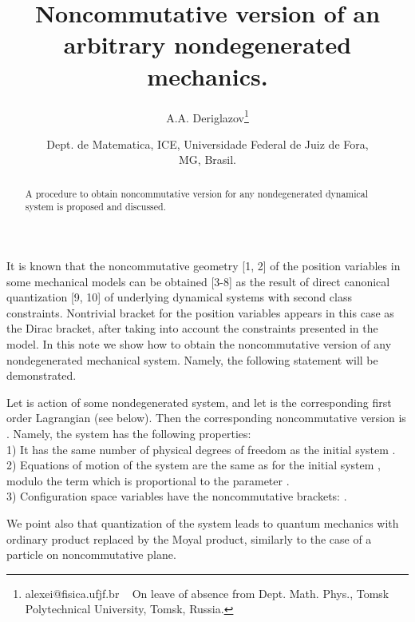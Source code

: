 \documentclass[paper a4]{article}
\title{Noncommutative version of an arbitrary nondegenerated mechanics.}
\author{A.A. Deriglazov\footnote{alexei@fisica.ufjf.br ~ On leave of
absence from Dept. Math. Phys., Tomsk Polytechnical University,
Tomsk, Russia.}}
\date{Dept. de Matematica, ICE, Universidade Federal de Juiz de Fora,\\
MG, Brasil.}
\begin{document}
\maketitle
\large
\begin{abstract}
A procedure to obtain noncommutative version for any nondegenerated
dynamical system is proposed and discussed.
\end{abstract}


\noindent
It is known that the
noncommutative geometry [1, 2] of the position variables in some mechanical
models can be obtained [3-8] as the result of direct canonical quantization
[9, 10] of underlying dynamical
systems with second class constraints. Nontrivial bracket for
the position variables appears in this case as the Dirac bracket,
after taking into account the constraints presented in the model.
In this note we show how to
obtain the noncommutative version of any nondegenerated mechanical system.
Namely, the following statement will be demonstrated.

Let \coordHE{} is action of some nondegenerated system,
and let \coordHE{} is
the corresponding first order Lagrangian (see below). Then the corresponding
noncommutative version is
\coordHE{}.
Namely, the system \coordHE{} has the following properties: \\
1) It has the same number of physical degrees of freedom as the initial
system \coordHE{}. \\
2) Equations of motion of the system are the same as for the initial
system \coordHE{}, modulo the term which is proportional to the parameter
\coordHE{}. \\
3) Configuration space variables have the noncommutative brackets:
\coordHE{}.

We point also that quantization of the system \coordHE{} leads to quantum
mechanics with ordinary product replaced by the Moyal product,
similarly to the case of a particle on noncommutative plane.
\end{document}
